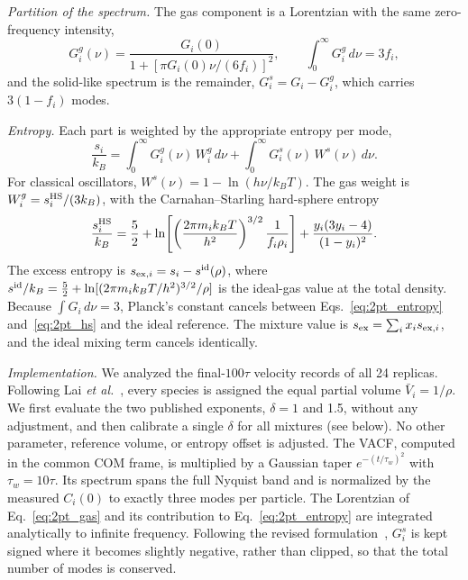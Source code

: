\documentclass[aps,pre,twocolumn,superscriptaddress,floatfix]{revtex4-2}
\begin{document}
\emph{Partition of the spectrum.} The gas component is a Lorentzian with the same zero-frequency intensity,
\begin{equation}
G_i^{g}(\nu)=\frac{G_i(0)}{1+\left[\pi G_i(0)\nu/(6f_i)\right]^2},\qquad \int_0^\infty G_i^{g}\,d\nu=3f_i,
\label{eq:2pt_gas}
\end{equation}
and the solid-like spectrum is the remainder, $G_i^{s}=G_i-G_i^{g}$, which carries $3(1-f_i)$ modes.

\emph{Entropy.} Each part is weighted by the appropriate entropy per mode,
\begin{equation}
\frac{s_i}{k_B}=\int_0^\infty G_i^{g}(\nu)\,W^{g}_i\,d\nu+\int_0^\infty G_i^{s}(\nu)\,W^{s}(\nu)\,d\nu .
\label{eq:2pt_entropy}
\end{equation}
For classical oscillators, $W^{s}(\nu)=1-\ln(h\nu/k_BT)$. The gas weight is $W^{g}_i=s^{\rm HS}_i/(3k_B)$, with the Carnahan--Starling hard-sphere entropy
\begin{equation}
\frac{s^{\rm HS}_i}{k_B}=\frac52+\ln\!\left[\left(\frac{2\pi m_ik_BT}{h^2}\right)^{3/2}\frac{1}{f_i\rho_{i}}\right]+\frac{y_i(3y_i-4)}{(1-y_i)^2}.
\label{eq:2pt_hs}
\end{equation}
The excess entropy is $s_{{\rm ex},i}=s_i-s^{\rm id}(\rho)$, where $s^{\rm id}/k_B=\frac52+\ln[(2\pi m_ik_BT/h^2)^{3/2}/\rho]$ is the ideal-gas value at the total density. Because $\int G_i\,d\nu=3$, Planck's constant cancels between Eqs.~\eqref{eq:2pt_entropy} and~\eqref{eq:2pt_hs} and the ideal reference. The mixture value is $s_{\rm ex}=\sum_ix_is_{{\rm ex},i}$, and the ideal mixing term cancels identically.

\emph{Implementation.} We analyzed the final-$100\tau$ velocity records of all 24 replicas. Following Lai \emph{et al.}~\cite{Lai2012}, every species is assigned the equal partial volume $\bar V_i=1/\rho$. We first evaluate the two published exponents, $\delta=1$ and 1.5, without any adjustment, and then calibrate a single $\delta$ for all mixtures (see below). No other parameter, reference volume, or entropy offset is adjusted. The VACF, computed in the common COM frame, is multiplied by a Gaussian taper $e^{-(t/\tau_w)^2}$ with $\tau_w=10\tau$. Its spectrum spans the full Nyquist band and is normalized by the measured $C_i(0)$ to exactly three modes per particle. The Lorentzian of Eq.~\eqref{eq:2pt_gas} and its contribution to Eq.~\eqref{eq:2pt_entropy} are integrated analytically to infinite frequency. Following the revised formulation~\cite{Sun2017}, $G_i^{s}$ is kept signed where it becomes slightly negative, rather than clipped, so that the total number of modes is conserved.
\end{document}

